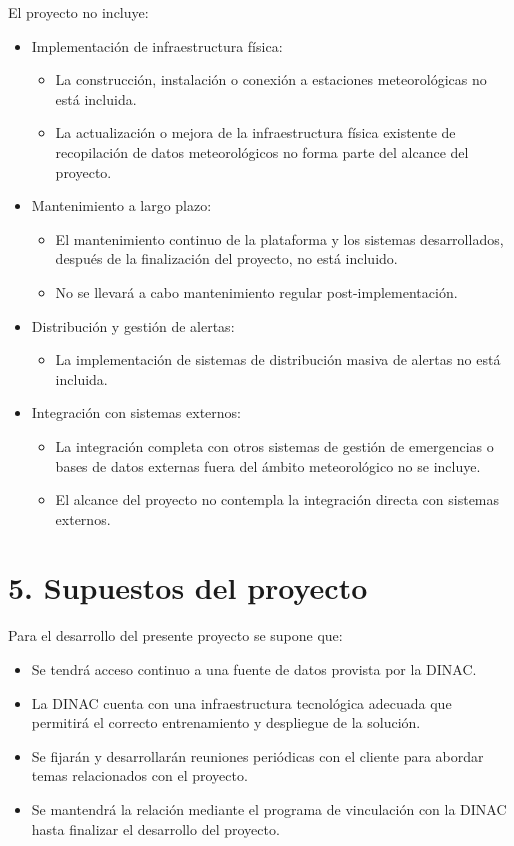 \documentclass[
11pt, %
codirector, %
]{charter}
\begin{document}
El proyecto no incluye:
\begin{itemize}
	\item Implementación de infraestructura física:
		\begin{itemize}
		\item La construcción, instalación o conexión a estaciones meteorológicas no está incluida.
		\item La actualización o mejora de la infraestructura física existente de recopilación de datos meteorológicos no forma parte del alcance del proyecto.
		\end{itemize}
	\item Mantenimiento a largo plazo:
		\begin{itemize}
		\item El mantenimiento continuo de la plataforma y los sistemas desarrollados, después de la finalización del proyecto, no está incluido.
		\item No se llevará a cabo mantenimiento regular post-implementación.
		\end{itemize}
	\item Distribución y gestión de alertas:
		\begin{itemize}
		\item La implementación de sistemas de distribución masiva de alertas no está incluida.
		\end{itemize}
	\item Integración con sistemas externos:
		\begin{itemize}
		\item La integración completa con otros sistemas de gestión de emergencias o bases de datos externas fuera del ámbito meteorológico no se incluye.
		\item El alcance del proyecto no contempla la integración directa con sistemas externos.
		\end{itemize}

\end{itemize}

\section{5. Supuestos del proyecto}
\label{sec:supuestos}

Para el desarrollo del presente proyecto se supone que: 

\begin{itemize}
	\item Se tendrá acceso continuo a una fuente de datos provista por la DINAC.
	\item La DINAC cuenta con una infraestructura tecnológica adecuada que permitirá el correcto entrenamiento y despliegue de la solución.
	\item Se fijarán y desarrollarán reuniones periódicas con el cliente para abordar temas relacionados con el proyecto.
	\item Se mantendrá la relación mediante el programa de vinculación con la DINAC hasta finalizar el desarrollo del proyecto.
\end{itemize}
\end{document}
